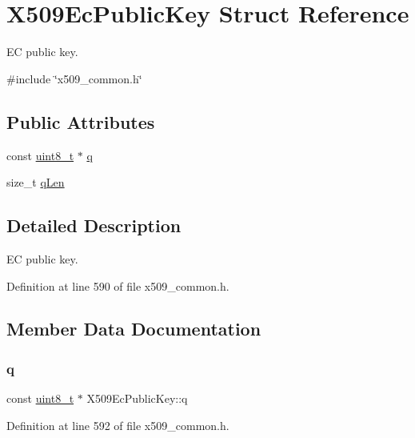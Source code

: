 \hypertarget{structX509EcPublicKey}{}\section{X509\+Ec\+Public\+Key Struct Reference}
\label{structX509EcPublicKey}


EC public key.  




{\ttfamily \#include \char`\"{}x509\+\_\+common.\+h\char`\"{}}

\subsection*{Public Attributes}
\begin{DoxyCompactItemize}
\item 
const \hyperlink{stdint_8h_aba7bc1797add20fe3efdf37ced1182c5}{uint8\+\_\+t} $\ast$ \hyperlink{structX509EcPublicKey_a40d2e839059193580054d744529d0131}{q}
\item 
size\+\_\+t \hyperlink{structX509EcPublicKey_a62e05abdaa08ec4418a624e44b84a5b8}{q\+Len}
\end{DoxyCompactItemize}


\subsection{Detailed Description}
EC public key. 

Definition at line 590 of file x509\+\_\+common.\+h.



\subsection{Member Data Documentation}
\mbox{\label{structX509EcPublicKey_a40d2e839059193580054d744529d0131}} 
\subsubsection{\texorpdfstring{q}{q}}
{\footnotesize\ttfamily const \hyperlink{stdint_8h_aba7bc1797add20fe3efdf37ced1182c5}{uint8\+\_\+t} $\ast$ X509\+Ec\+Public\+Key\+::q}



Definition at line 592 of file x509\+\_\+common.\+h.

